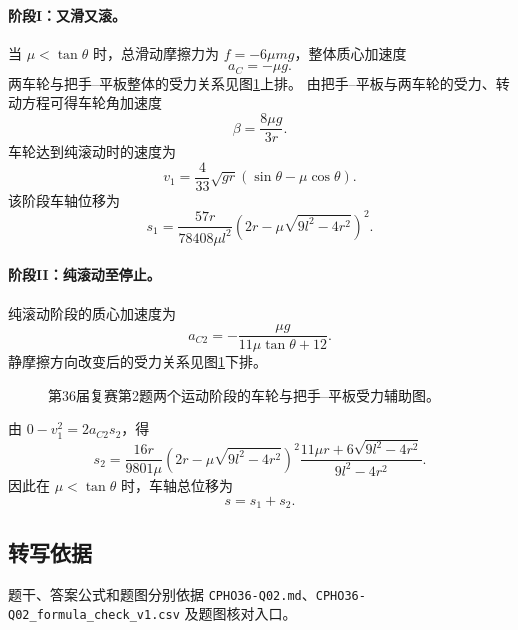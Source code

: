 \paragraph{阶段I：又滑又滚。} 当 $\mu<\tan\theta$ 时，总滑动摩擦力为 $f=-6\mu mg$，整体质心加速度
\[
a_C=-\mu g.
\]
两车轮与把手--平板整体的受力关系见图\ref{fig:cpho36q02forces}上排。
由把手--平板与两车轮的受力、转动方程可得车轮角加速度
\[
\beta=\frac{8\mu g}{3r}.
\]
车轮达到纯滚动时的速度为
\[
v_1=\frac4{33}\sqrt{gr}(\sin\theta-\mu\cos\theta).
\]
该阶段车轴位移为
\[
s_1=\frac{57r}{78408\mu l^2}
\left(2r-\mu\sqrt{9l^2-4r^2}\right)^2.
\]

\paragraph{阶段II：纯滚动至停止。} 纯滚动阶段的质心加速度为
\[
a_{C2}=-\frac{\mu g}{11\mu\tan\theta+12}.
\]
静摩擦方向改变后的受力关系见图\ref{fig:cpho36q02forces}下排。
\begin{figure}[htbp]\centering

\caption{第36届复赛第2题两个运动阶段的车轮与把手--平板受力辅助图。}\label{fig:cpho36q02forces}
\end{figure}
由 $0-v_1^2=2a_{C2}s_2$，得
\[
s_2=\frac{16r}{9801\mu}
\left(2r-\mu\sqrt{9l^2-4r^2}\right)^2
\frac{11\mu r+6\sqrt{9l^2-4r^2}}{9l^2-4r^2}.
\]
因此在 $\mu<\tan\theta$ 时，车轴总位移为
\[
\boxed{s=s_1+s_2.}
\]

\subsection{转写依据}
题干、答案公式和题图分别依据 \texttt{CPHO36-Q02.md}、\texttt{CPHO36-Q02\_formula\_check\_v1.csv} 及题图核对入口。
